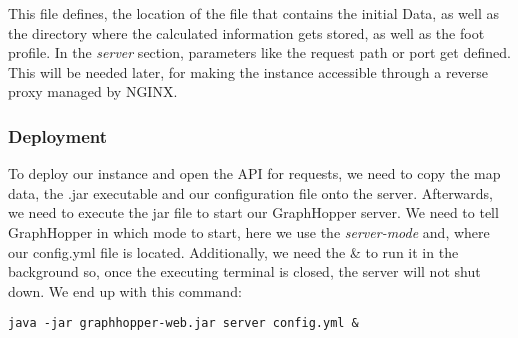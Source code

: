 This file defines, the location of the file that contains the initial Data, as well as the directory where the calculated information gets stored, as well as the foot profile. In the \textit{server} section, parameters like the request path or port get defined. This will be needed later, for making the instance accessible through a reverse proxy managed by NGINX. 

\subsubsection{Deployment}
To deploy our instance and open the API for requests, we need to copy the map data, the .jar executable and our configuration file onto the server. Afterwards, we need to execute the jar file to start our GraphHopper server. We need to tell GraphHopper in which mode to start, here we use the \textit{server-mode} and, where our config.yml file is located. Additionally, we need the \& to run it in the background so, once the executing terminal is closed, the server will not shut down. We end up with this command:


\begin{center}
  \texttt{java -jar graphhopper-web.jar server config.yml \&}
\end{center}
\newpage